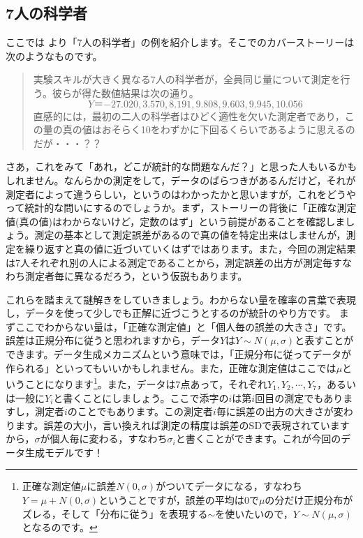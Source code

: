 \documentclass{ltjsbook}
\begin{document}
\subsection{7人の科学者}
ここでは \textcite{Lee201709}より「7人の科学者」の例を紹介します。そこでのカバーストーリーは次のようなものです。

\begin{quote}
	実験スキルが大きく異なる7人の科学者が，全員同じ量について測定を行う。彼らが得た数値結果は次の通り。
	$$Y＝{-27.020,3.570,8.191,9.808,9.603,9.945,10.056}$$
	直感的には，最初の二人の科学者はひどく適性を欠いた測定者であり，この量の真の値はおそらく10をわずかに下回るくらいであるように思えるのだが・・・？？
\end{quote}

さあ，これをみて「あれ，どこが統計的な問題なんだ？」と思った人もいるかもしれません。なんらかの測定をして，データのばらつきがあるんだけど，それが測定者によって違うらしい，というのはわかったかと思いますが，これをどうやって統計的な問いにするのでしょうか。まず，ストーリーの背後に「正確な測定値(真の値)はわからないけど，定数のはず」という前提があることを確認しましょう。測定の基本として測定誤差があるので真の値を特定出来はしませんが，測定を繰り返すと真の値に近づいていくはずではあります。また，今回の測定結果は7人それぞれ別の人による測定であることから，測定誤差の出方が測定毎すなわち測定者毎に異なるだろう，という仮説もあります。

これらを踏まえて謎解きをしていきましょう。わからない量を確率の言葉で表現し，データを使って少しでも正解に近づこうとするのが統計のやり方です。
まずここでわからない量は，「正確な測定値」と「個人毎の誤差の大きさ」です。誤差は正規分布に従うと思われますから，データ$Y$は$Y\sim N(\mu, \sigma)$と表すことができます。データ生成メカニズムという意味では，「正規分布に従ってデータが作られる」といってもいいかもしれません。また，正確な測定値はここでは$\mu$ということになります\footnote{正確な測定値$\mu$に誤差$N(0,\sigma)$がついてデータになる，すなわち$Y=\mu+N(0,\sigma)$ということですが，誤差の平均は$0$で$\mu$の分だけ正規分布がズレる，そして「分布に従う」を表現する$\sim$を使いたいので，$Y\sim N(\mu,\sigma)$となるのです。}。また，データは7点あって，それぞれ$Y_1,Y_2,\cdots,Y_7$，あるいは一般に$Y_i$と書くことにしましょう。ここで添字の$i$は第$i$回目の測定でもありますし，測定者$i$のことでもあります。この測定者$i$毎に誤差の出方の大きさが変わります。誤差の大小，言い換えれば測定の精度は誤差のSDで表現されていますから，$\sigma$が個人毎に変わる，すなわち$\sigma_i$と書くことができます。これが今回のデータ生成モデルです！
\end{document}
